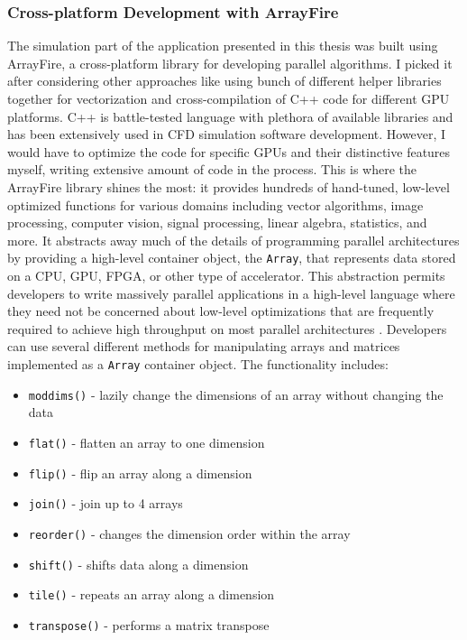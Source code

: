
\subsubsection{Cross-platform Development with ArrayFire}\label{sec:cross-platform-af}
The simulation part of the application presented in this thesis was built using ArrayFire, a cross-platform library for developing parallel algorithms. I picked it after considering other approaches like using bunch of different helper libraries together for vectorization and cross-compilation of C++ code for different GPU platforms. C++ is battle-tested language with plethora of available libraries and has been extensively used in CFD simulation software development. However, I would have to optimize the code for specific GPUs and their distinctive features myself, writing extensive amount of code in the process. This is where the ArrayFire library shines the most: it provides hundreds of hand-tuned, low-level optimized functions for various domains including vector algorithms, image processing, computer vision, signal processing, linear algebra, statistics, and more. It abstracts away much of the details of programming parallel architectures by providing a high-level container object, the \texttt{Array}, that represents data stored on a CPU, GPU, FPGA, or other type of accelerator. This abstraction permits developers to write massively parallel applications in a high-level language where they need not be concerned about low-level optimizations that are frequently required to achieve high throughput on most parallel architectures \citep{Yalamanchili2015}. Developers can use several different methods for manipulating arrays and matrices implemented as a \texttt{Array} container object. The functionality includes:

\begin{itemize}
	\item \texttt{moddims()} - lazily change the dimensions of an array without changing the data
	\item \texttt{flat()}  - flatten an array to one dimension
	\item \texttt{flip()}  - flip an array along a dimension
	\item \texttt{join()}  - join up to 4 arrays
	\item \texttt{reorder()}  - changes the dimension order within the array
	\item \texttt{shift()}  - shifts data along a dimension
	\item \texttt{tile()}  - repeats an array along a dimension
	\item \texttt{transpose()}  - performs a matrix transpose
\end{itemize}

